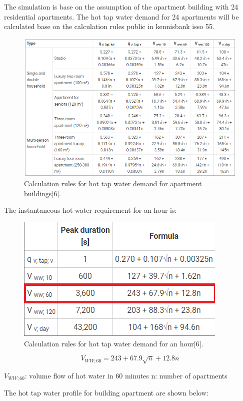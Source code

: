 \documentclass[a4paper,10pt]{article}
\begin{document}
The simulation is base on the assumption of the apartment building with 24 residential apartments.
The hot tap water demand for 24 apartments will be calculated base on the calculation rules public in kennisbank isso 55.

\begin{figure}[H]
\centering
\includegraphics[width=1\columnwidth]{pictures/Calculation rules for hot tap water demand for apartment buildings.png}
\caption[Short title]{Calculation rules for hot tap water demand for apartment buildings[6].}
\label{fig:ff9}\end{figure}
The instantaneous hot water requirement for an hour is:

\begin{figure}[H]
\centering
\includegraphics[width=0.5\columnwidth]{pictures/tap water demand in an hour.png}
\caption[Short title]{Calculation rules for hot tap water demand for an hour[6].}
\label{fig:ff10}\end{figure}

\begin{equation}
V_{WW;60} = 243 + 67.9\sqrt{n} + 12.8n
\end{equation}

$V_{WW;60}$: volume flow of hot water in 60 minutes
n: number of apartments

The hot tap water profile for building apartment are shown below:
\end{document}
